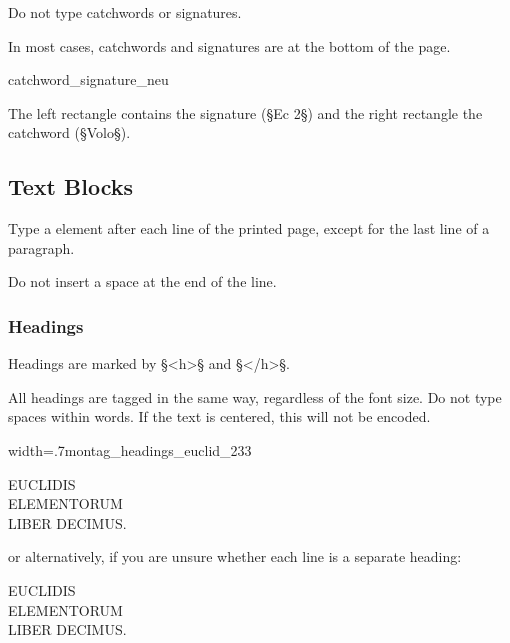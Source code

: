 \begin{mainrule}
Do not type catchwords or signatures.
\end{mainrule}

\begin{clarification}
In most cases, catchwords and signatures are at the bottom of the page.
\end{clarification}

\begin{sampleImage}{catchword_signature_neu}

\notTranscribed

The left rectangle contains the signature (§Ec 2§) and the right rectangle the catchword (§Volo§).
\end{sampleImage}


\tocspace
\subsection{Text Blocks}

\begin{mainrule}
Type a  element after each line of the printed page, except for the last line of a paragraph.
\end{mainrule}

\begin{clarification}
Do not insert a space at the end of the line.
\end{clarification}


\subsubsection{Headings}
\label{section headings}

\begin{mainrule}
Headings are marked by §<h>§ and §</h>§.
\end{mainrule}

\begin{clarification}
All headings are tagged in the same way, regardless of the font size. Do not type spaces within words. If the text is centered, this will not be encoded.
\end{clarification}

\begin{sampleImageSmall}{width=.7\linewidth}{montag_headings_euclid_233}
\begin{typeLatin}
EUCLIDIS \\
ELEMENTORUM \\
LIBER DECIMUS.
\end{typeLatin}
or alternatively, if you are unsure whether each line is a separate heading:
\begin{typeLatin}
EUCLIDIS \\
ELEMENTORUM \\
LIBER DECIMUS.
\end{typeLatin}
\end{sampleImageSmall}


